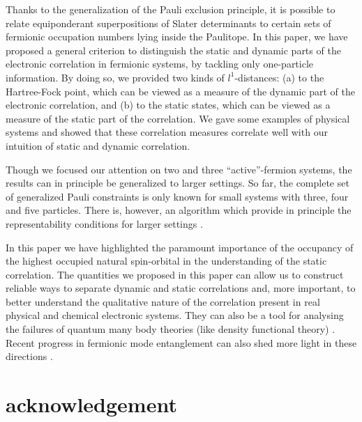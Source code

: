 \documentclass[aps,twocolumn,showpacs,pra,superscriptaddress,floatfix,longbibliography]{revtex4-1}
\newcommand{\7}{\dagger}
\begin{document}
Thanks to the generalization of the Pauli exclusion 
principle, it is possible to relate equiponderant 
superpositions of Slater determinants to certain sets of 
fermionic occupation numbers lying inside the Paulitope. 
In this paper, we have proposed a general criterion 
to distinguish the static and dynamic parts of the electronic 
correlation in fermionic systems, by tackling only one-particle 
information. By doing so, we provided 
two kinds of $l^1$-distances: (a)
to the Hartree-Fock point, which can be viewed as a measure 
of the dynamic part of the electronic correlation, and (b) to 
the static states, which can be viewed as a measure of 
the static part of the correlation.
We gave some examples of physical systems
and showed that these correlation measures correlate 
well with our intuition of static and dynamic correlation.

Though we focused our attention on two and three 
``active''-fermion systems, the results can in principle be 
generalized to larger settings. So far, the complete set of 
generalized Pauli constraints is only known for small systems
with three, four and five particles. There is, however, an algorithm 
which provide in principle the representability conditions
for larger settings \cite{Kly2}.

In this paper we have highlighted the paramount 
importance of the occupancy of the highest 
occupied natural spin-orbital in the understanding of 
the static correlation. The quantities we proposed in this 
paper can allow us to construct reliable ways to separate 
dynamic and static correlations and, more important, 
to better understand the qualitative nature of the correlation 
present in real physical and chemical electronic systems. 
They can also be a tool for analysing the failures of quantum 
many body theories (like density functional theory)
\cite{Chai}. Recent progress in fermionic mode entanglement 
can also shed more light in these directions \cite{doi:10.1021/ct400247p,Friis}.


\section*{acknowledgement}
\end{document}
